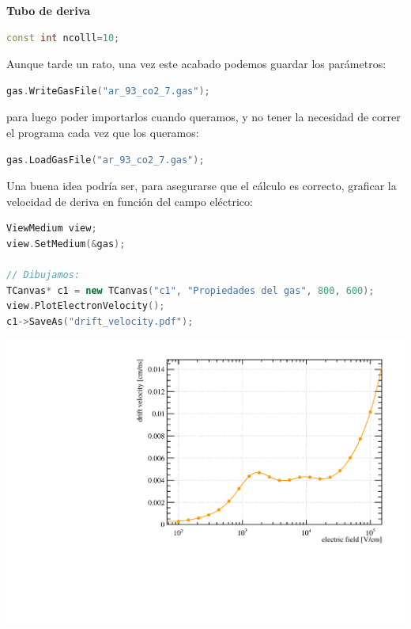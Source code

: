 \begin{Ejemplo}{\textbf{Tubo de deriva}}
\begin{lstlisting}[language=C++,style=c++]
const int ncolll=10;
\end{lstlisting} 

Aunque tarde un rato, una vez este acabado podemos guardar los parámetros:  \\

\begin{lstlisting}[language=C++,style=c++]
gas.WriteGasFile("ar_93_co2_7.gas");
\end{lstlisting} 

\vspace*{1em}

para luego poder importarlos cuando queramos, y no tener la necesidad de correr el programa cada vez que los queramos: \\


\begin{lstlisting}[language=C++,style=c++]
gas.LoadGasFile("ar_93_co2_7.gas");
\end{lstlisting} 

\vspace*{1em}

Una buena idea podría ser, para asegurarse que el cálculo es correcto, graficar la velocidad de deriva en función del campo eléctrico: \\

\begin{lstlisting}[language=C++,style=c++]
ViewMedium view;
view.SetMedium(&gas);

// Dibujamos: 
TCanvas* c1 = new TCanvas("c1", "Propiedades del gas", 800, 600);
view.PlotElectronVelocity();
c1->SaveAs("drift_velocity.pdf");
\end{lstlisting} 

\begin{center}
    \includegraphics[width=0.6\linewidth]{Chapters/EjemploGarfield/TuboDeriva/build/drift_velocity.pdf}
\end{center}


\end{Ejemplo}
